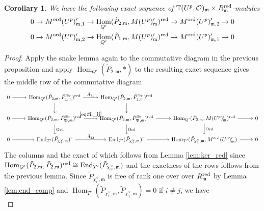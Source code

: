 \documentclass[leqno]{amsart}
\newtheorem{cor}[thm]{Corollary}
\theoremstyle{definition}
\theoremstyle{remark}
\newcommand{\oo}{\mathcal{O}}
\DeclareMathOperator{\End}{End}
\DeclareMathOperator{\Hom}{Hom}
\newcommand{\fm}{\mathfrak{m}}
\DeclareMathOperator{\Ord}{Ord} %
\newcommand{\B}{\mathfrak B} %
\newcommand{\red}{\textnormal{red}}
\newcommand{\TT}{\mathbb{T}} %
\newcommand{\ord}{\textnormal{ord}} %
\begin{document}
\begin{cor}\label{cor:fil_by_ord}
	We have the following exact sequence of
	$\TT(U^p,\oo)_\fm\times R_{\fm}^{\red}$-modules
\begin{equation*}
\begin{aligned}
	0\to M^{\ord}(U^p)_{\fm,1}'\to
	\Hom_{Q'}(\tilde{P}_{2,\fm},M(U^p)_{\fm}')^{\red}
    \to
	M^{\ord}(U^p)_{\fm,2}'\to0\\
	0\to M^{\ord}(U^p)_{\fm,2}'\to
	\Hom_{Q'}(\tilde{P}_{1,\fm},M(U^p)_{\fm}')^{\red}
    \to
	M^{\ord}(U^p)_{\fm,1}'\to0
\end{aligned}
\end{equation*}
\end{cor}
\begin{proof}
    Apply the snake lemma again to the 
    commutative diagram in the previous proposition 
    and apply $\Hom_{Q'}(\tilde{P}_{2,\fm},*)$
    to the resulting exact sequence
	gives the middle row of the commutative diagram
\begin{equation*}
    \begin{tikzcd}
	    0 \arrow[r]& 
	    \Hom_{Q'}(\tilde{P}_{2,\fm},\tilde{P}_{1,\fm}^{\oplus r})^{\red}
	    \arrow[r,"\bar{A}_{11}"] \arrow[d]&
	    \Hom_{Q'}(\tilde{P}_{2,\fm}, \tilde{P}_{1,\fm}^{\oplus r})^{\red}
	    \arrow[d] &&\\
	    0\arrow[r] & 
	    \Hom_{Q'}(\tilde{P}_{2,\fm},\tilde{P}_{\B,\fm}^{\oplus r})^{\red}
	    \arrow[r,"\eqref{eq:fil_ij}"] \arrow[d,"\Ord"] &
	    \Hom_{Q'}(\tilde{P}_{2,\fm},\tilde{P}_{\B,\fm}^{\oplus r})^{\red}
	    \arrow[d,"\Ord"] \arrow[r]&
	    \Hom_{Q'}(\tilde{P}_{2,\fm}, M(U^p)_{\fm}')^{\red}\arrow[r]
        \arrow[d,"\Ord"] &0\\
	    0\arrow[r] & 
	    \End_{T'}(\tilde{P}_{\chi_2^\vee,\fm})^{r}
	    \arrow[r,"\bar{A}_{22}"] &
	    \End_{T'}(\tilde{P}_{\chi_2^\vee,\fm})^{r}
        \arrow[r]&
        \Hom_{T'}(\tilde{P}_{\chi_2^\vee,\fm}, M^{\ord}(U^p)_\fm')
        \arrow[r]&0
    \end{tikzcd}
\end{equation*}
The columns and the exact of which follows from 
Lemma \ref{lem:ker_red} since
$\Hom_{Q'}(\tilde{P}_{2,\fm}, \tilde{P}_{2,\fm})^{\red}
\cong \End_{T'}(\tilde{P}_{\chi_2^\vee,\fm})$
and the exactness of the rows follows from the previous lemma.
Since $\tilde{P}_{\chi_i^\vee,\fm}$
is free of rank one over over $R_\fm^{\red}$
by Lemma \ref{lem:end_comp} and
$\Hom_{T'}(\tilde{P}_{\chi_i^\vee,\fm},\tilde{P}_{\chi_j^\vee,\fm})=0$
if $i\neq j$, we have
\begin{equation}

\end{equation}
\end{proof}
\end{document}
